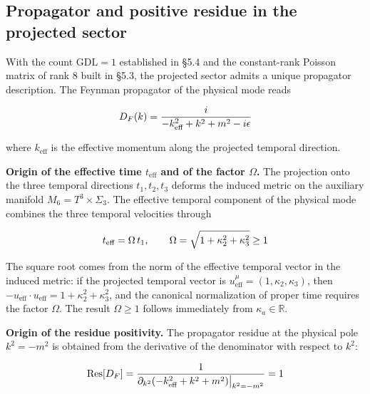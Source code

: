 ﻿\documentclass[11pt,letterpaper]{article}
\begin{document}
\subsection{Propagator and positive residue in the projected sector}
With the count $\mathrm{GDL} = 1$ established in §5.4 and the constant-rank Poisson matrix of rank $8$ built in §5.3, the projected sector admits a unique propagator description. The Feynman propagator of the physical mode reads

\begin{equation*}
  \resizebox{\ifdim\width>\linewidth \linewidth\else\width\fi}{!}{$\displaystyle D_F(k) = \frac{i}{-k_{\text{eff}}^2 + k^2 + m^2 - i\epsilon}$}
\end{equation*}

where $k_{\text{eff}}$ is the effective momentum along the projected temporal direction.

\textbf{Origin of the effective time $t_{\text{eff}}$ and of the factor $\Omega$.} The projection onto the three temporal directions $t_1, t_2, t_3$ deforms the induced metric on the auxiliary manifold $M_6 = T^3 \times \Sigma_3$. The effective temporal component of the physical mode combines the three temporal velocities through

\begin{equation*}
  \resizebox{\ifdim\width>\linewidth \linewidth\else\width\fi}{!}{$\displaystyle t_{\text{eff}} = \Omega\,t_1, \qquad \Omega = \sqrt{1 + \kappa_2^2 + \kappa_3^2} \geq 1$}
\end{equation*}

The square root comes from the norm of the effective temporal vector in the induced metric: if the projected temporal vector is $u^{\mu}_{\text{eff}} = (1, \kappa_2, \kappa_3)$, then $-u_{\text{eff}} \cdot u_{\text{eff}} = 1 + \kappa_2^2 + \kappa_3^2$, and the canonical normalization of proper time requires the factor $\Omega$. The result $\Omega \geq 1$ follows immediately from $\kappa_a \in \mathbb{R}$.

\textbf{Origin of the residue positivity.} The propagator residue at the physical pole $k^2 = -m^2$ is obtained from the derivative of the denominator with respect to $k^2$:

\begin{equation*}
  \resizebox{\ifdim\width>\linewidth \linewidth\else\width\fi}{!}{$\displaystyle \mathrm{Res}[D_F] = \frac{1}{\partial_{k^2}(-k_{\text{eff}}^2 + k^2 + m^2)\big|_{k^2 = -m^2}} = 1$}
\end{equation*}
\end{document}
